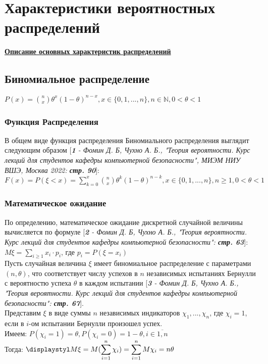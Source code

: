 \documentclass[14pt,a4paper,oneside]{extbook}
\begin{document}
	\chapter{Характеристики вероятностных распределений}
	
	\underline{\textbf{Описание основных характеристик распределений}}
	\section{Биномиальное распределение}
	$\displaystyle P(x) = \binom{n}{x}\theta^{x}(1-\theta)^{n-x}, x \in \{0, 1, ..., n\}, n \in \mathbb {N}, 0 < \theta < 1$ 
	
	\subsection{Функция Распределения}
	В общем виде функция распределения Биномиального распределения выглядит следующим образом [\textit{\textbf{1} - Фомин Д. Б, Чухно А. Б., "Теория вероятности. Курс лекций для студентов кафедры компьютерной безопасности", МИЭМ НИУ ВШЭ, Москва 2022: \textbf{стр. 90}}]: \\
	$F(x) = P(\xi < x) = \displaystyle\sum_{k=0}^{x} \binom{n}{x}\theta^{k}(1-\theta)^{n-k}, x \in \{0,1,...,n\}, n \geq 1, 0 < \theta < 1$
	
	\subsection{Математическое ожидание}
	По определению, математическое ожидание дискретной случайной величины вычисляется по формуле [\textit{\textbf{2} - Фомин Д. Б, Чухно А. Б., "Теория вероятности. Курс лекций для студентов кафедры компьютерной безопасности": \textbf{стр. 63}}]: \\
	$\displaystyle M\xi = \displaystyle\sum_{i\geq1}x_i \cdot p_i$, где $p_i = P(\xi = x_i)$ \\
	Пусть случайная величина $\xi$ имеет биномиальное распределение с параметрами $(n, \theta)$, что соответствует числу успехов в $n$ независимых испытаниях Бернулли с вероятностю успеха $\theta$ в каждом испытании [\textit{\textbf{3} - Фомин Д. Б, Чухно А. Б., "Теория вероятности. Курс лекций для студентов кафедры компьютерной безопасности": \textbf{стр. 67}}]. \\
	Представим $\xi$ в виде суммы $n$ независимых индикаторов $\chi_1,...,\chi_n$, где $\chi_i = 1$, если в $i$-ом испытании Бернулли произошел успех. \\
	Имеем: $\displaystyle P(\chi_i = 1) = \theta, P(\chi_i = 0) = 1 - \theta, i \in \overline{1,n}$ \\
	Тогда: $\displaystyl M\xi = M(\displaystyle\sum_{i = 1}^{n}\chi_i) = \displaystyle\sum_{i=1}^{n}M\chi_i = n\theta$
	
\end{document}

